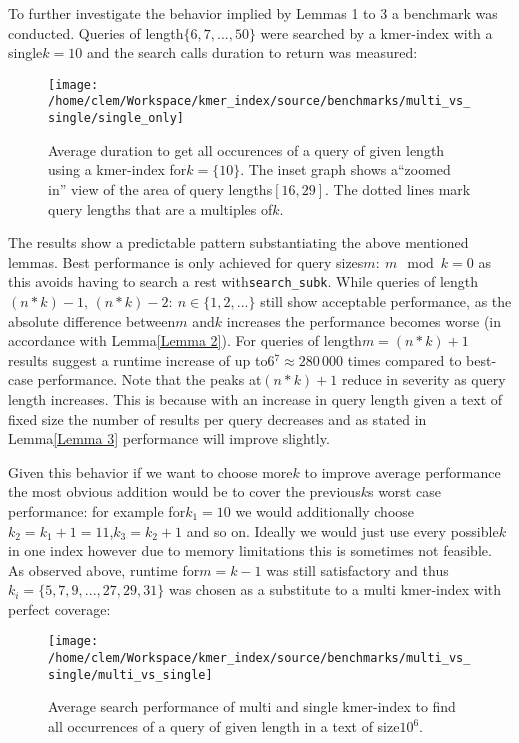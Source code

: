 To further investigate the behavior implied by Lemmas 1 to 3 a benchmark
was conducted. Queries of length$\{6,7,...,50\}$ were searched by
a kmer-index with a single$k=10$ and the search calls duration to
return was measured:

\begin{figure}[H]
\texttt{[image: /home/clem/Workspace/kmer\_index/source/benchmarks/multi\_vs\_single/single\_only]}

\caption{\label{figure 1}Average duration to get all occurences of a query
of given length using a kmer-index for$k=\{10\}$. The inset graph
shows a``zoomed in'' view of the area of query lengths$[16,29]$.
The dotted lines mark query lengths that are a multiples of$k$.}

\end{figure}

The results show a predictable pattern substantiating the above mentioned
lemmas. Best performance is only achieved for query sizes$m:\:m\mod k=0$
as this avoids having to search a rest with\lstinline{search_subk}.
While queries of length$(n*k)-1,\,(n*k)-2:\:n\in\{1,2,...\}$ still
show acceptable performance, as the absolute difference between$m$
and$k$ increases the performance becomes worse (in accordance with
Lemma\ref{Lemma 2}). For queries of length$m=(n*k)+1$ results suggest
a runtime increase of up to$6{{}^7}\approx280\,000$ times compared
to best-case performance. Note that the peaks at$(n*k)+1$ reduce
in severity as query length increases. This is because with an increase
in query length given a text of fixed size the number of results per
query decreases and as stated in Lemma\ref{Lemma 3} performance will
improve slightly.

Given this behavior if we want to choose more$k$ to improve average
performance the most obvious addition would be to cover the previous$k$s
worst case performance: for example for$k_{1}=10$ we would additionally
choose$k_{2}=k_{1}+1=11$,$k_{3}=k_{2}+1$ and so on. Ideally we would
just use every possible$k$ in one index however due to memory limitations
this is sometimes not feasible. As observed above, runtime for$m=k-1$
was still satisfactory and thus$k_{i}=\{5,7,9,...,27,29,31\}$ was
chosen as a substitute to a multi kmer-index with perfect coverage:

\begin{figure}[H]
\texttt{[image: /home/clem/Workspace/kmer\_index/source/benchmarks/multi\_vs\_single/multi\_vs\_single]}

\caption{Average search performance of multi and single kmer-index to find
all occurrences of a query of given length in a text of size$10^{6}$.}
\end{figure}

